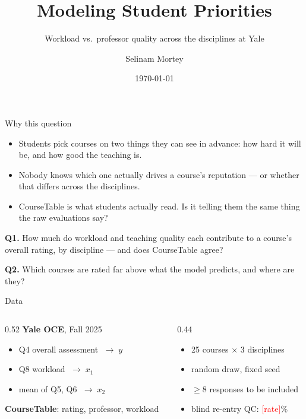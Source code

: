 \documentclass[aspectratio=169]{beamer}
\title{Modeling Student Priorities}
\subtitle{Workload vs.\ professor quality across the disciplines at Yale}
\author{\tbd{Member A} \and \tbd{Member B} \and Selinam Mortey}
\date{\today}
\newcommand{\tbd}[1]{\textcolor{red}{[#1]}}
\begin{document}
\begin{frame}
  \titlepage
\end{frame}

\begin{frame}{Why this question}
  \begin{itemize}
    \item Students pick courses on two things they can see in advance: how hard
      it will be, and how good the teaching is.
    \item Nobody knows which one actually drives a course's reputation --- or
      whether that differs across the disciplines.
    \item CourseTable is what students actually read. Is it telling them the
      same thing the raw evaluations say?
  \end{itemize}
  \vfill
  \textbf{Q1.} How much do workload and teaching quality each contribute to a
  course's overall rating, by discipline --- and does CourseTable agree?

  \textbf{Q2.} Which courses are rated far above what the model predicts, and
  where are they?
\end{frame}

\begin{frame}{Data}
  \begin{columns}[T]
    \begin{column}{0.52\textwidth}
      \textbf{Yale OCE}, Fall 2025
      \begin{itemize}\small
        \item Q4 overall assessment $\;\to\; y$
        \item Q8 workload $\;\to\; x_1$
        \item mean of Q5, Q6 $\;\to\; x_2$
      \end{itemize}
      \vspace{0.5em}
      \textbf{CourseTable}: rating, professor, workload
    \end{column}
    \begin{column}{0.44\textwidth}
      \begin{itemize}\small
        \item 25 courses $\times$ 3 disciplines
        \item random draw, fixed seed
        \item $\geq 8$ responses to be included
        \item blind re-entry QC: \tbd{rate}\%
      \end{itemize}
    \end{column}
  \end{columns}
\end{frame}
\end{document}
